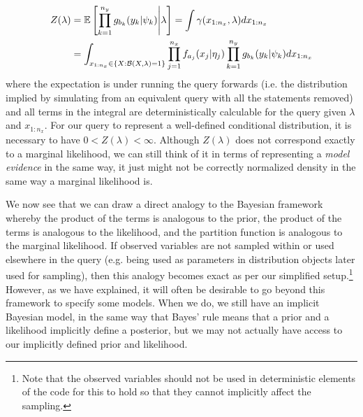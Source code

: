\begin{align}
\label{eq:probprog:mod}
Z(\lambda) &= \mathbb{E} \left[ \prod_{k=1}^{n_y} g_{b_k}(y_k | \psi_k) \middle| \lambda \right] = \int \gamma(x_{1:n_x},\lambda) dx_{1:n_x}\nonumber\\
&= \int_{x_{1:n_x} \in \{X : \mathcal{B}(X,\lambda)=1\}} 
\prod_{j=1}^{n_x} f_{a_j}(x_j | \eta_j) \prod_{k=1}^{n_y} g_{b_k}(y_k | \psi_k) dx_{1:n_x}
\end{align}
where the expectation is under running the query forwards (i.e. the distribution implied by simulating
from an equivalent query with all the \observe statements removed) and 
all terms in the integral are deterministically calculable for the query given $\lambda$ and $x_{1:n_x}$.
For our query to represent a well-defined conditional distribution, it is necessary to have
$0<Z(\lambda)<\infty$.  Although $Z(\lambda)$ does not correspond exactly to a marginal likelihood,
we can still think of it in terms of representing a \emph{model evidence} in the same way, it just might
not be correctly normalized density in the same way a marginal likelihood is.

We now see that we can draw a direct analogy to the Bayesian framework whereby the product of the
\sample terms is analogous to the prior, the product of the \observe terms is analogous to the
likelihood, and the partition function is analogous to the marginal likelihood.  If observed variables
are not sampled within or used elsewhere in the query (e.g. being used as parameters in distribution objects
later used for sampling), then this analogy becomes exact as per our simplified setup.\footnote{Note that the
	observed variables should not be used in deterministic elements of the code for this to hold so that they
	cannot implicitly affect the sampling.}  However, as we have explained, it will often be desirable to go
beyond this framework to specify some models.  When we do, we still have an implicit Bayesian model, in the
same way that Bayes' rule means that a prior and a likelihood implicitly define a posterior, but we may not
actually have access to our implicitly defined prior and likelihood.

